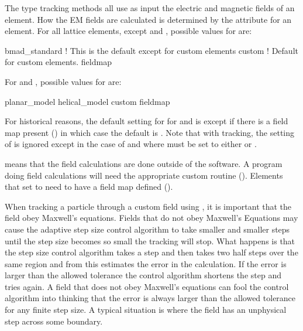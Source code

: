 The  type tracking methods all use as input the electric and magnetic fields of
an element. How the EM fields are calculated is determined by the  attribute for an
element.  For all lattice elements, except  and , possible values for
 are:
\begin{example}
  bmad_standard     ! This is the default except for custom elements
  custom            ! Default for custom elements.
  fieldmap
\end{example}
For  and , possible values for  are:
\begin{example}
  planar_model
  helical_model
  custom
  fieldmap
\end{example}
For historical reasons, the default setting for  for  and
 is  except if there is a field map present () in
which case the default is .  Note that with  tracking, the setting of
 is ignored except in the case of  and  where
 must be set to either  or .

 means that the field calculations are done outside of the \bmad software. A program
doing  field calculations will need the appropriate custom routine ().
Elements that set  to  need to have a field map defined
().

 When tracking a particle through a custom field using , it is
important that the field obey Maxwell's equations. Fields that do not obey Maxwell's Equations may
cause the  adaptive step size control algorithm to take smaller and smaller steps
until the step size becomes so small the tracking will stop. What happens is that the step size
control algorithm takes a step and then takes two half steps over the same region and from this
estimates the error in the calculation. If the error is larger than the allowed tolerance the
control algorithm shortens the step and tries again. A field that does not obey Maxwell's equations
can fool the control algorithm into thinking that the error is always larger than the allowed
tolerance for any finite step size. A typical situation is where the field has an unphysical step
across some boundary.

